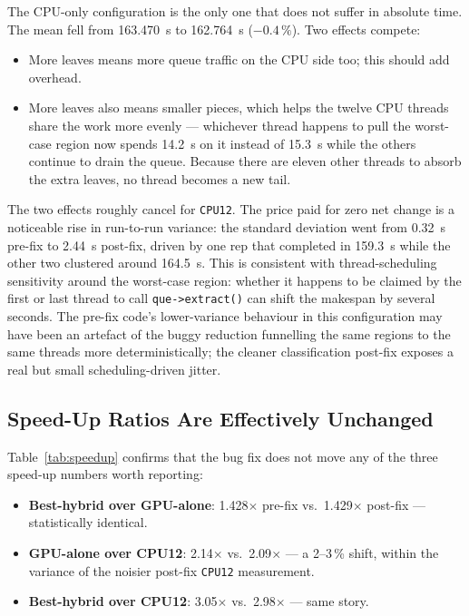 \documentclass[
	english,
	letterpaper, oneside
]{article}
\begin{document}
The CPU-only configuration is the only one that does not suffer
in absolute time. The mean fell from 163.470~s to 162.764~s
($-0.4\,\%$). Two effects compete:

\begin{itemize}
    \item More leaves means more queue traffic on the CPU side too;
    this should add overhead.
    \item More leaves also means smaller pieces, which helps the
    twelve CPU threads share the work more evenly --- whichever thread
    happens to pull the worst-case region now spends 14.2~s on it
    instead of 15.3~s while the others continue to drain the queue.
    Because there are eleven other threads to absorb the extra leaves,
    no thread becomes a new tail.
\end{itemize}

\noindent
The two effects roughly cancel for \texttt{CPU12}. The price paid for
zero net change is a noticeable rise in run-to-run variance: the
standard deviation went from 0.32~s pre-fix to 2.44~s post-fix, driven
by one rep that completed in 159.3~s while the other two clustered
around 164.5~s. This is consistent with thread-scheduling sensitivity
around the worst-case region: whether it happens to be claimed by the
first or last thread to call \texttt{que->extract()} can shift the
makespan by several seconds. The pre-fix code's lower-variance behaviour
in this configuration may have been an artefact of the buggy reduction
funnelling the same regions to the same threads more deterministically;
the cleaner classification post-fix exposes a real but small
scheduling-driven jitter.

\subsection{Speed-Up Ratios Are Effectively Unchanged}

Table~\ref{tab:speedup} confirms that the bug fix does not move any of
the three speed-up numbers worth reporting:

\begin{itemize}
    \item \textbf{Best-hybrid over GPU-alone}: 1.428$\times$ pre-fix vs.\
    1.429$\times$ post-fix --- statistically identical.
    \item \textbf{GPU-alone over CPU12}: 2.14$\times$ vs.\ 2.09$\times$
    --- a 2--3\,\% shift, within the variance of the noisier post-fix
    \texttt{CPU12} measurement.
    \item \textbf{Best-hybrid over CPU12}: 3.05$\times$ vs.\
    2.98$\times$ --- same story.
\end{itemize}
\end{document}
